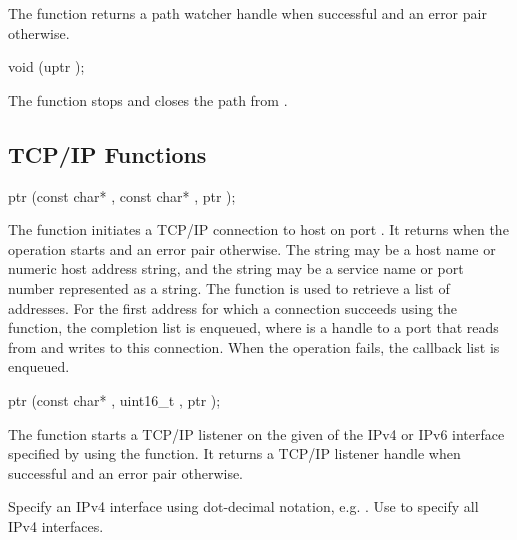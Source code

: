 The  function returns a path watcher handle
when successful and an error pair otherwise.

\begin{function}
  void (uptr );
\end{function}

The  function stops and closes the
path  from .

\subsection {TCP/IP Functions}

\begin{function}
  ptr (const char* , const char* , ptr );
\end{function}

The  function initiates a TCP/IP connection to
host  on port . It returns  when the
operation starts and an error pair otherwise. The  string
may be a host name or numeric host address string, and the
 string may be a service name or port number represented
as a string. The  function is used to retrieve a
list of addresses. For the first address for which a connection
succeeds using the  function, the completion
list  is enqueued, where 
is a handle to a port that reads from and writes to this
connection. When the operation fails, the callback list
 is enqueued.

\begin{function}
  ptr (const char* , uint16\_t , ptr );
\end{function}

The  function starts a TCP/IP listener on the
given  of the IPv4 or IPv6 interface specified by
 using the  function. It returns a
TCP/IP listener handle when successful and an error pair otherwise.

Specify an IPv4 interface  using dot-decimal notation,
e.g. . Use  to specify all IPv4
interfaces.

